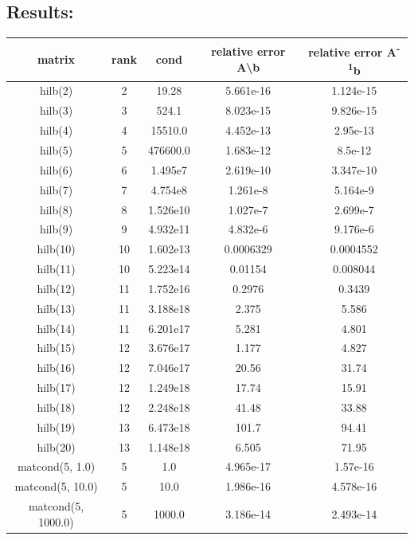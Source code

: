 \documentclass{article}
\begin{document}
\subsection*{Results:}
\begin{center}
    \begin{tabular}{| c | c | c | c | c |}
        \hline
        matrix & rank  & cond & relative error A\textbackslash b & relative error A\textsuperscript{-1}b \\
        \hline
        \hline
        hilb(2) & 2 & 19.28 & 5.661e-16 & 1.124e-15\\
        hilb(3) & 3 & 524.1 & 8.023e-15 & 9.826e-15\\
        hilb(4) & 4 & 15510.0 & 4.452e-13 & 2.95e-13\\
        hilb(5) & 5 & 476600.0 & 1.683e-12 & 8.5e-12\\
        hilb(6) & 6 & 1.495e7 & 2.619e-10 & 3.347e-10\\
        hilb(7) & 7 & 4.754e8 & 1.261e-8 & 5.164e-9\\
        hilb(8) & 8 & 1.526e10 & 1.027e-7 & 2.699e-7\\
        hilb(9) & 9 & 4.932e11 & 4.832e-6 & 9.176e-6\\
        hilb(10) & 10 & 1.602e13 & 0.0006329 & 0.0004552\\
        hilb(11) & 10 & 5.223e14 & 0.01154 & 0.008044\\
        hilb(12) & 11 & 1.752e16 & 0.2976 & 0.3439\\
        hilb(13) & 11 & 3.188e18 & 2.375 & 5.586\\
        hilb(14) & 11 & 6.201e17 & 5.281 & 4.801\\
        hilb(15) & 12 & 3.676e17 & 1.177 & 4.827\\
        hilb(16) & 12 & 7.046e17 & 20.56 & 31.74\\
        hilb(17) & 12 & 1.249e18 & 17.74 & 15.91\\
        hilb(18) & 12 & 2.248e18 & 41.48 & 33.88\\
        hilb(19) & 13 & 6.473e18 & 101.7 & 94.41\\
        hilb(20) & 13 & 1.148e18 & 6.505 & 71.95\\
        \hline
        matcond(5, 1.0) & 5 & 1.0 & 4.965e-17 & 1.57e-16\\
        matcond(5, 10.0) & 5 & 10.0 & 1.986e-16 & 4.578e-16\\
        matcond(5, 1000.0) & 5 & 1000.0 & 3.186e-14 & 2.493e-14\\

\end{tabular}
\end{center}
\end{document}
